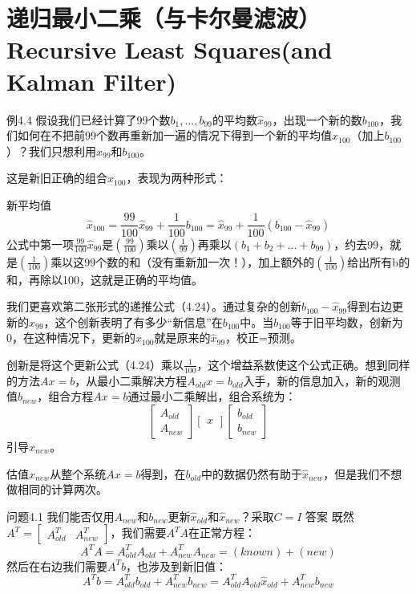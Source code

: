 \section[递归最小二乘（与卡尔曼滤波）]{递归最小二乘（与卡尔曼滤波）\\Recursive Least Squares(and Kalman Filter)}
例4.4 \quad 假设我们已经计算了99个数$b_1,...,b_{99}$的平均数$\hat{x}_{99}$，出现一个新的数$b_{100}$，我们如何在不把前99个数再重新加一遍的情况下得到一个新的平均值$\hat{x}_{100}$（加上$b_{100}$）？我们只想利用$\hat{x}_{99}$和$b_100$。

这是新旧正确的组合$\hat{x}_{100}$，表现为两种形式：

新平均值 
\begin{equation}
\hat{x}_{100}=\frac{99}{100}\hat{x}_{99}+\frac{1}{100}b_{100}=\hat{x}_{99}+\frac{1}{100}(b_{100}-\hat{x}_{99})
\end{equation}
公式中第一项$\frac{99}{100}\hat{x}_{99}$是$(\frac{99}{100})$乘以$(\frac{1}{99})$再乘以$(b_1+b_2+...+b_{99})$，约去99，就是$(\frac{1}{100})$乘以这99个数的和（没有重新加一次！），加上额外的$(\frac{1}{100})$给出所有b的和，再除以100，这就是正确的平均值。

我们更喜欢第二张形式的递推公式（4.24）。通过复杂的创新$b_{100}-\hat{x}_{99}$得到右边更新的$\hat{x}_{99}$，这个创新表明了有多少“新信息”在$b_{100}$中。当$b_{100}$等于旧平均数，创新为0，在这种情况下，更新的$\hat{x}_{100}$就是原来的$\hat{x}_{99}$，校正=预测。

创新是将这个更新公式（4.24）乘以$\frac{1}{100}$，这个增益系数使这个公式正确。想到同样的方法$Ax=b$，从最小二乘解决方程$A_{old}x=b_{old}$入手，新的信息加入，新的观测值$b_{new}$，组合方程$Ax=b$通过最小二乘解出，组合系统为：
\begin{equation}
\begin{bmatrix}
A_{old} \\ A_{new}
\end{bmatrix}
\begin{bmatrix}
x
\end{bmatrix}
\begin{bmatrix}
b_{old} \\ b_{new}
\end{bmatrix}
\end{equation}
引导$\hat{x}_{new}$。

估值$\hat{x}_{new}$从整个系统$Ax=b$得到，在$b_{old}$中的数据仍然有助于$\hat{x}_{new}$，但是我们不想做相同的计算两次。

问题4.1  \quad 我们能否仅用$A_{new}$和$b_{new}$更新$\hat{x}_{old}$和$\hat{x}_{new}$？采取$C=I$
答案 \quad  既然$A^T=\begin{bmatrix} A^T_{old} & A^T_{new}\end{bmatrix}$，我们需要$A^TA$在正常方程：
\begin{equation}
A^TA=A^T_{old}A_{old}+A^T_{new}A_{new}=(known)+(new)
\end{equation}
然后在右边我们需要$A^Tb$，也涉及到新旧值：
\begin{equation}
A^Tb=A^T_{old}b_{old}+A^T_{new}b_{new}=A^T_{old}A_{old}\hat{x}_{old}+A^T_{new}b_{new}
\end{equation}

